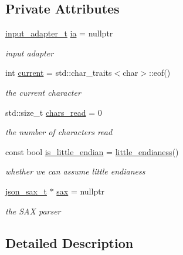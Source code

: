 \subsection*{Private Attributes}
\begin{DoxyCompactItemize}
\item 
\hyperlink{namespacenlohmann_1_1detail_ae132f8cd5bb24c5e9b40ad0eafedf1c2}{input\+\_\+adapter\+\_\+t} \hyperlink{classnlohmann_1_1detail_1_1binary__reader_a21ceb754c46a4920b966be7de48c34ad}{ia} = nullptr
\begin{DoxyCompactList}\small\item\em input adapter \end{DoxyCompactList}\item 
int \hyperlink{classnlohmann_1_1detail_1_1binary__reader_aadd621ccddf3539f2ed4e2038d531870}{current} = std\+::char\+\_\+traits$<$char$>$\+::eof()
\begin{DoxyCompactList}\small\item\em the current character \end{DoxyCompactList}\item 
std\+::size\+\_\+t \hyperlink{classnlohmann_1_1detail_1_1binary__reader_a287aa2641bfcb0e47f6cd4657692f9a2}{chars\+\_\+read} = 0
\begin{DoxyCompactList}\small\item\em the number of characters read \end{DoxyCompactList}\item 
const bool \hyperlink{classnlohmann_1_1detail_1_1binary__reader_aa846bdda08720535b26d8c90b939bc37}{is\+\_\+little\+\_\+endian} = \hyperlink{classnlohmann_1_1detail_1_1binary__reader_a1e31dbfcf9567c8c2d4f0e4eb1b0230a}{little\+\_\+endianess}()
\begin{DoxyCompactList}\small\item\em whether we can assume little endianess \end{DoxyCompactList}\item 
\hyperlink{classnlohmann_1_1detail_1_1binary__reader_a43c5dc6a3219f64a7824d7ba9c7b14ae}{json\+\_\+sax\+\_\+t} $\ast$ \hyperlink{classnlohmann_1_1detail_1_1binary__reader_ac9313177e414403e3e5784340d838b3f}{sax} = nullptr
\begin{DoxyCompactList}\small\item\em the S\+AX parser \end{DoxyCompactList}\end{DoxyCompactItemize}


\subsection{Detailed Description}
